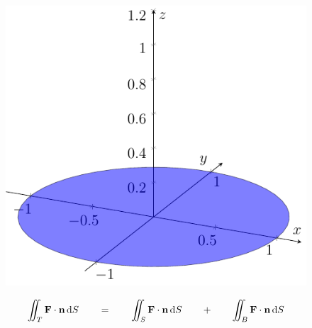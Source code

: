 \begin{frame}
\begin{figure}[ht]
\begin{minipage}[b]{0.30\linewidth}
        \end{minipage}
        \hspace{0.30cm}
        \begin{minipage}[b]{0.30\linewidth}
            \centering
            \includegraphics[width=\textwidth]{../img/2-Bunn.pdf}
        \end{minipage}
    \end{figure}
\begin{align*}
    \iint_{T} \mathbf{F} \cdot \mathbf{n} \mathop{}\! \mathrm{d} S\mathop{}\!
    \qquad =  \qquad
    \iint_{S} \mathbf{F} \cdot \mathbf{n} \mathop{}\! \mathrm{d} S\mathop{}\!
    \qquad + \qquad
    \iint_{B} \mathbf{F} \cdot \mathbf{n} \mathop{}\! \mathrm{d} S\mathop{}\!
\end{align*}
\end{frame}

